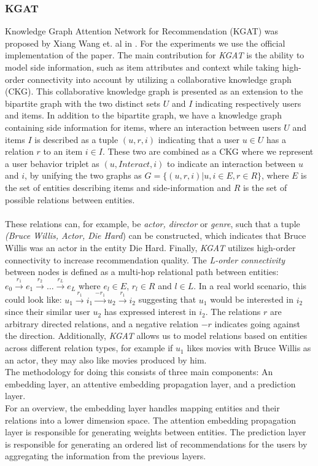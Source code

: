 \subsubsection{KGAT}
Knowledge Graph Attention Network for Recommendation (KGAT) was proposed by Xiang Wang et. al in \cite{KGAT}.
For the experiments we use the official implementation of the paper.
The main contribution for \textit{KGAT} is the ability to model side information, such as item attributes and context while taking high-order connectivity into account by utilizing a collaborative knowledge graph (CKG).
This collaborative knowledge graph is presented as an extension to the bipartite graph with the two distinct sets $U$ and $I$ indicating respectively users and items.
In addition to the bipartite graph, we have a knowledge graph containing side information for items, where an interaction between users $U$ and items $I$ is described as a tuple $(u, r, i)$ indicating that a user $u \in U$ has a relation $r$ to an item $i \in I$.
These two are combined as a CKG where we represent a user behavior triplet as $(u, Interact, i)$ to indicate an interaction between $u$ and $i$, by unifying the two graphs as $G = \{(u, r, i) | u, i \in E, r \in R\}$, where $E$ is the set of entities describing items and side-information and $R$ is the set of possible relations between entities.\\\\
These relations can, for example, be \textit{actor, director} or \textit {genre}, such that a tuple \textit{(Bruce Willis, Actor, Die Hard}) can be constructed, which indicates that Bruce Willis was an actor in the entity Die Hard.
Finally, \textit{KGAT} utilizes high-order connectivity to increase recommendation quality.
The \textit{L-order connectivity} between nodes is defined as a multi-hop relational path between entities: $e_0 \overset{r_1}{\rightarrow} e_1 \overset{r_2}{\rightarrow} \dots \overset{r_L}{\rightarrow} e_L$ where $e_l \in E$, $r_l \in R$ and $l \in L$.
In a real world scenario, this could look like: $u_1 \overset{r_1}{\rightarrow} i_1 \overset{-r_1}{\rightarrow} u_2 \overset{r_1}{\rightarrow} i_2$ suggesting that $u_1$ would be interested in $i_2$ since their similar user $u_2$ has expressed interest in $i_2$.
The relations $r$ are arbitrary directed relations, and a negative relation $-r$ indicates going against the direction.
Additionally, \textit{KGAT} allows us to model relations based on entities across different relation types, for example if $u_1$ likes movies with Bruce Willis as an actor, they may also like movies produced by him.
\\
The methodology for doing this consists of three main components: An embedding layer, an attentive embedding propagation layer, and a prediction layer.\\
For an overview, the embedding layer handles mapping entities and their relations into a lower dimension space.
The attention embedding propagation layer is responsible for generating weights between entities.
The prediction layer is responsible for generating an ordered list of recommendations for the users by aggregating the information from the previous layers.
